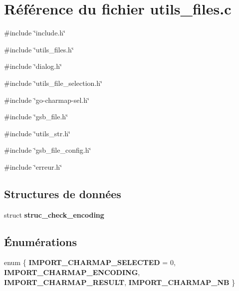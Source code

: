 \section{Référence du fichier utils\_\-files.c}
\label{utils__files_8c}
{\ttfamily \#include \char`\"{}include.h\char`\"{}}\par
{\ttfamily \#include \char`\"{}utils\_\-files.h\char`\"{}}\par
{\ttfamily \#include \char`\"{}dialog.h\char`\"{}}\par
{\ttfamily \#include \char`\"{}utils\_\-file\_\-selection.h\char`\"{}}\par
{\ttfamily \#include \char`\"{}go-\/charmap-\/sel.h\char`\"{}}\par
{\ttfamily \#include \char`\"{}gsb\_\-file.h\char`\"{}}\par
{\ttfamily \#include \char`\"{}utils\_\-str.h\char`\"{}}\par
{\ttfamily \#include \char`\"{}gsb\_\-file\_\-config.h\char`\"{}}\par
{\ttfamily \#include \char`\"{}erreur.h\char`\"{}}\par
\subsection*{Structures de données}
\begin{DoxyCompactItemize}
\item 
struct {\bf struc\_\-check\_\-encoding}
\end{DoxyCompactItemize}
\subsection*{Énumérations}
\begin{DoxyCompactItemize}
\item 
enum \{ {\bf IMPORT\_\-CHARMAP\_\-SELECTED} =  0, 
{\bf IMPORT\_\-CHARMAP\_\-ENCODING}, 
{\bf IMPORT\_\-CHARMAP\_\-RESULT}, 
{\bf IMPORT\_\-CHARMAP\_\-NB}
 \}
\end{DoxyCompactItemize}
